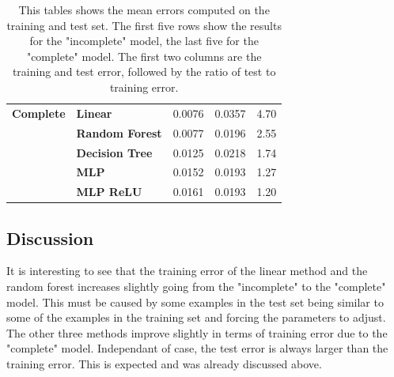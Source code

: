 \begin{table}[]
\begin{tabular}{l|l|l|l|l|}
\textbf{Complete}   & \textbf{Linear}        & 0.0076                                                                 & 0.0357                                                             & 4.70                     \\ \cline{2-5}
\textbf{}           & \textbf{Random Forest} & 0.0077                                                                 & 0.0196                                                             & 2.55                     \\ \cline{2-5}
\textbf{}           & \textbf{Decision Tree} & 0.0125                                                                 & 0.0218                                                             & 1.74                     \\ \cline{2-5}
\textbf{}           & \textbf{MLP}           & 0.0152                                                                 & 0.0193                                                             & 1.27                     \\ \cline{2-5}
\textbf{}           & \textbf{MLP ReLU}      & 0.0161                                                                 & 0.0193                                                             & 1.20                     \\ \cline{2-5}
\end{tabular}
\caption[Learnt mapping results]{This tables shows the mean errors computed on the training and test set. The first five rows show the results for the "incomplete" model, the last five for the "complete" model. The first two columns are the training and test error, followed by the ratio of test to training error.}
\end{table}

\subsection{Discussion}
It is interesting to see that the training error of the linear method and the random forest increases slightly going from the "incomplete" to the "complete" model. This must be caused by some examples in the test set being similar to some of the examples in the training set and forcing the parameters to adjust. The other three methods improve slightly in terms of training error due to the "complete" model. Independant of case, the test error is always larger than the training error. This is expected and was already discussed above.\\

